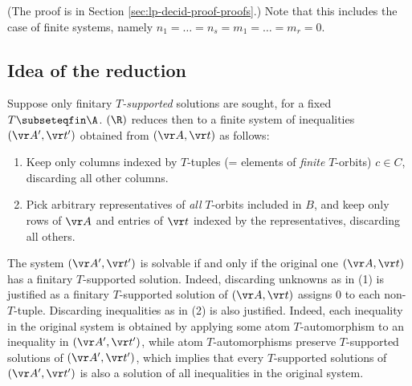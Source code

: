 \noindent
(The proof is in Section \ref{sec:lp-decid-proof-proofs}.)
Note that this includes the case of finite systems, namely
$n_1 = \ldots = n_s = m_1 = \ldots = m_r = 0$.

\subsection{Idea of the reduction}
%
Suppose only finitary \emph{$T$-supported} solutions are sought, for a fixed $T\subseteqfin\A$.
\finineqsolvname$(\R)$ reduces then to a finite system of inequalities $(\vr A', \vr t')$ obtained
from $(\vr A, \vr t)$ as follows:
%
\begin{enumerate}
\item[(1)] Keep only columns indexed by $T$-tuples (= elements of \emph{finite} $T$-orbits) $c\in C$, discarding all other columns.
\item[(2)]
Pick arbitrary representatives of \emph{all} $T$-orbits included in $B$, and  keep only rows of $\vr A$
and entries of $\vr t$ indexed by the representatives, discarding all others.
\end{enumerate}
%
The system $(\vr A', \vr t')$ is solvable if and only if the original one $(\vr A, \vr t)$ has
a finitary $T$-supported solution.
Indeed, discarding unknowns as in (1) is justified as a finitary $T$-supported solution of $(\vr A, \vr t)$ 
assigns $0$ to each non-$T$-tuple.
Discarding inequalities as in (2) is also justified.
Indeed, each inequality in the original system is obtained by applying some atom $T$-automorphism to an inequality
in $(\vr A', \vr t')$, while atom $T$-automorphisms preserve $T$-supported solutions of $(\vr A', \vr t')$,
which implies that every $T$-supported solutions of $(\vr A', \vr t')$ 
is also a solution of all inequalities in the original system.
%
%
%

